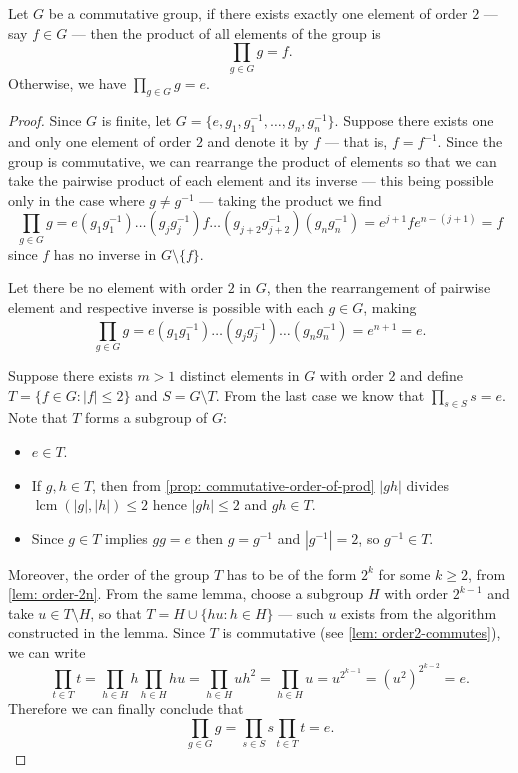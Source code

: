 \begin{proposition}
    Let \(G\) be a commutative group, if there exists exactly one element of order
    \(2\) --- say \(f \in G\) --- then the product of all elements of the group is
    \[
        \prod_{g \in G} g = f.
    \]
    Otherwise, we have \(\prod_{g \in G} g = e\).
\end{proposition}

\begin{proof}
    Since \(G\) is finite, let \(G = \{e, g_1, g_1^{-1}, \dots, g_n, g_n^{-1}\}\).
    Suppose there exists one and only one element of order \(2\) and denote it by
    \(f\) --- that is, \(f = f^{-1}\). Since the group is commutative, we can
    rearrange the product of elements so that we can take the pairwise product of
    each element and its inverse --- this being possible only in the case where
    \(g \neq g^{-1}\) --- taking the product we find
    \[
        \prod_{g \in G} g = e (g_1 g_1^{-1}) \dots (g_j g_j^{-1}) f \dots (g_{j + 2}
        g_{j + 2}^{-1}) (g_n g_n^{-1}) = e^{j + 1} f e^{n - (j + 1)} = f
    \]
    since \(f\) has no inverse in \(G \setminus \{f\}\).

    Let there be no element with order \(2\) in \(G\), then the rearrangement of
    pairwise element and respective inverse is possible with each \(g \in G\),
    making
    \[
        \prod_{g \in G} g = e (g_1 g_1^{-1}) \dots (g_j g_j^{-1}) \dots (g_n
        g_n^{-1}) = e^{n + 1} = e.
    \]

    Suppose there exists \(m > 1\) distinct elements in \(G\) with order \(2\) and
    define \(T = \{f \in G \colon |f| \leq 2\}\) and \(S = G \setminus T\). From the
    last case we know that \(\prod_{s \in S} s = e\). Note that \(T\) forms a
    subgroup of \(G\):
    \begin{itemize}
        \item \(e \in T\).
        \item If \(g, h \in T\), then from \cref{prop: commutative-order-of-prod}
              \(|gh|\) divides \(\operatorname{lcm}(|g|, |h|) \leq 2\) hence \(|gh| \leq
              2\) and \(gh \in T\).
        \item Since \(g \in T\) implies \(g g = e\) then \(g = g^{-1}\) and
              \(|g^{-1}| = 2\), so \(g^{-1} \in T\).
    \end{itemize}
    Moreover, the order of the group \(T\) has to be of the form \(2^k\) for some
    \(k \geq 2\), from \cref{lem: order-2n}. From the same lemma, choose a
    subgroup \(H\) with order \(2^{k-1}\) and take \(u \in T \setminus H\), so
    that \(T = H \cup \{hu \colon h \in H\}\) --- such \(u\) exists from the algorithm
    constructed in the lemma. Since \(T\) is commutative (see \cref{lem:
        order2-commutes}), we can write
    \[
        \prod_{t \in T} t = \prod_{h \in H} h \prod_{h \in H} hu = \prod_{h \in H} u
        h^2 = \prod_{h \in H} u = u^{2^{k-1}} = (u^2)^{2^{k-2}} = e.
    \]
    Therefore we can finally conclude that
    \[
        \prod_{g \in G} g = \prod_{s \in S} s \prod_{t \in T} t = e.
    \]
\end{proof}

